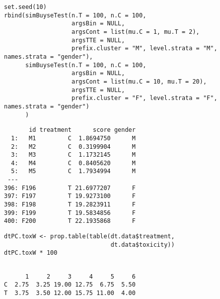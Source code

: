 \documentclass[12pt]{article}
\begin{document}
\lstset{language=r,label= ,caption= ,captionpos=b,numbers=none}
\begin{lstlisting}
set.seed(10)
rbind(simBuyseTest(n.T = 100, n.C = 100,
                   argsBin = NULL,
                   argsCont = list(mu.C = 1, mu.T = 2),
                   argsTTE = NULL,
                   prefix.cluster = "M", level.strata = "M", names.strata = "gender"),
      simBuyseTest(n.T = 100, n.C = 100,
                   argsBin = NULL,
                   argsCont = list(mu.C = 10, mu.T = 20),
                   argsTTE = NULL,
                   prefix.cluster = "F", level.strata = "F", names.strata = "gender")
      )
\end{lstlisting}

\begin{verbatim}
       id treatment      score gender
  1:   M1         C  1.8694750      M
  2:   M2         C  0.3199904      M
  3:   M3         C  1.1732145      M
  4:   M4         C  0.8405620      M
  5:   M5         C  1.7934994      M
 ---                                 
396: F196         T 21.6977207      F
397: F197         T 19.9273100      F
398: F198         T 19.2823911      F
399: F199         T 19.5834856      F
400: F200         T 22.1935868      F
\end{verbatim}


\lstset{language=r,label= ,caption= ,captionpos=b,numbers=none}
\begin{lstlisting}
dtPC.toxW <- prop.table(table(dt.data$treatment,
                              dt.data$toxicity))
dtPC.toxW * 100
\end{lstlisting}

\begin{verbatim}

      1     2     3     4     5     6
C  2.75  3.25 19.00 12.75  6.75  5.50
T  3.75  3.50 12.00 15.75 11.00  4.00
\end{verbatim}
\end{document}

